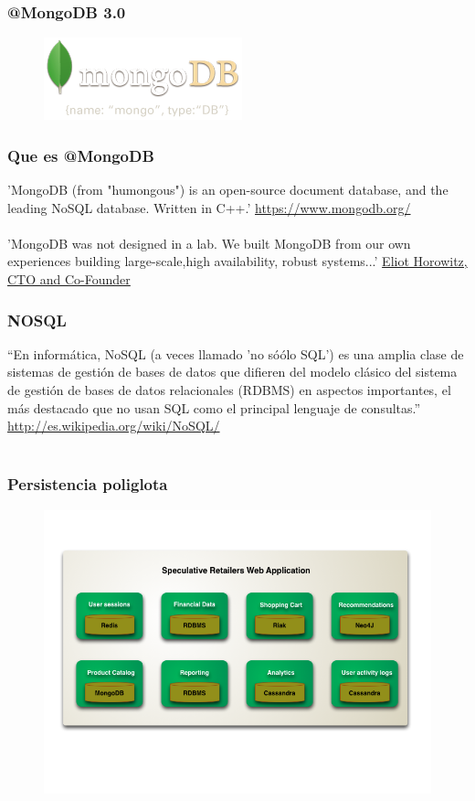 \documentclass{beamer}
\begin{document}
\begin{frame}
\frametitle{@MongoDB 3.0}
\begin{figure}
\includegraphics[width=0.4\linewidth]{mongodb.png}
\end{figure}
\end{frame}
\begin{frame}
\frametitle{Que es @MongoDB}
'MongoDB (from "humongous") is an open-source document database, and the leading NoSQL database. Written in C++.'
{\color{blue}\url{https://www.mongodb.org/}}
\\~\\
'MongoDB was not designed in a lab. We built MongoDB from our own experiences building large-scale,high availability, robust systems...'
\underline{\color{green}Eliot Horowitz, CTO and Co-Founder}	
\end{frame}


\begin{frame}
\frametitle{NOSQL}
“En inform\'atica, NoSQL (a veces llamado 'no só\'olo SQL') es una amplia clase de sistemas de gesti\'on de bases de datos que difieren del modelo cl\'asico del sistema de gesti\'on de bases de datos relacionales (RDBMS) en aspectos importantes, el m\'as destacado que no usan SQL como el principal lenguaje de consultas.” {\color{blue}\url{http://es.wikipedia.org/wiki/NoSQL/}}
\\~\\

\end{frame}


\begin{frame}
\frametitle{Persistencia poliglota}
\begin{figure}
\includegraphics[width=1.0\linewidth]{polyglot.png}
\end{figure}
\end{frame}
\end{document}

